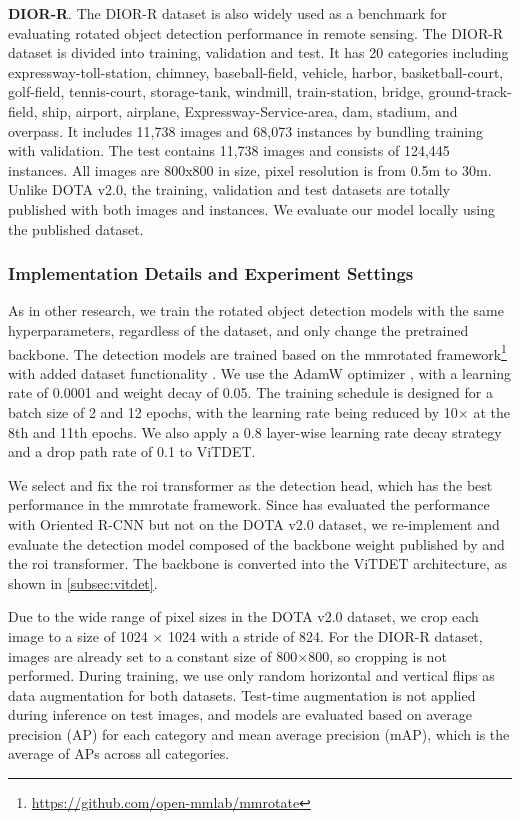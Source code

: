 \textbf{DIOR-R}.  The DIOR-R dataset is also widely used as a benchmark for evaluating rotated object detection performance in remote sensing. The DIOR-R dataset is divided into training, validation and test. It has 20 categories including expressway-toll-station, chimney, baseball-field, vehicle, harbor, basketball-court, golf-field, tennis-court, storage-tank, windmill, train-station, bridge, ground-track-field, ship, airport, airplane, Expressway-Service-area, dam, stadium, and overpass. It includes 11,738 images and 68,073 instances by bundling training with validation. The test contains 11,738 images and consists of 124,445 instances. All images are 800x800 in size, pixel resolution is from 0.5m to 30m. Unlike DOTA v2.0, the training, validation and test datasets are totally published with both images and instances. We evaluate our model locally using the published dataset.

\subsubsection{Implementation Details and Experiment Settings}

As in other research, we train the rotated object detection models with the same hyperparameters, regardless of the dataset, and only change the pretrained backbone. The detection models are trained based on the mmrotated framework\footnote{\url{https://github.com/open-mmlab/mmrotate}} with added dataset functionality \cite{zhou2022mmrotate}. We use the AdamW optimizer \cite{loshchilov2017decoupled}, with a learning rate of 0.0001 and weight decay of 0.05. The training schedule is designed for a batch size of 2 and 12 epochs, with the learning rate being reduced by 10$\times$ at the 8th and 11th epochs. We also apply a 0.8 layer-wise learning rate decay strategy and a drop path rate of 0.1 to ViTDET.

We select and fix the roi transformer \cite{ding2019learning} as the detection head, which has the best performance in the mmrotate framework. Since \cite{wang2022advancing} has evaluated the performance with Oriented R-CNN \cite{xie2021oriented} but not on the DOTA v2.0 dataset, we re-implement and evaluate the detection model composed of the backbone weight published by \cite{wang2022advancing} and the roi transformer. The backbone is converted into the ViTDET architecture, as shown in \autoref{subsec:vitdet}.

Due to the wide range of pixel sizes in the DOTA v2.0 dataset, we crop each image to a size of 1024 $\times$ 1024 with a stride of 824. For the DIOR-R dataset, images are already set to a constant size of 800$\times$800, so cropping is not performed. During training, we use only random horizontal and vertical flips as data augmentation for both datasets. Test-time augmentation is not applied during inference on test images, and models are evaluated based on average precision (AP) for each category and mean average precision (mAP), which is the average of APs across all categories.


